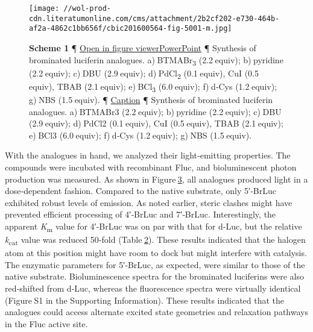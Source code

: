 \begin{figure}
\centering
\texttt{[image: //wol-prod-cdn.literatumonline.com/cms/attachment/2b2cf202-e730-464b-af2a-4862c1bb656f/cbic201600564-fig-5001-m.jpg]}
\caption{\textbf{Scheme 1} ¶ \protect\hyperlink{}{Open in figure
viewer}\href{/action/downloadFigures?id=cbic201600564-fig-5001\&doi=10.1002\%2Fcbic.201600564}{PowerPoint}
¶ Synthesis of brominated luciferin analogues.
a) BTMABr\textsubscript{3} (2.2 equiv); b) pyridine (2.2 equiv); c) DBU
(2.9 equiv); d) PdCl\textsubscript{2} (0.1 equiv), CuI (0.5 equiv), TBAB
(2.1 equiv); e) BCl\textsubscript{3} (6.0 equiv); f) {d}‐Cys
(1.2 equiv); g) NBS (1.5 equiv). ¶
\protect\hyperlink{}{{Caption}\emph{}} ¶ Synthesis of brominated
luciferin analogues. a) BTMABr3 (2.2 equiv); b) pyridine (2.2 equiv);
c) DBU (2.9 equiv); d) PdCl2 (0.1 equiv), CuI (0.5 equiv), TBAB
(2.1 equiv); e) BCl3 (6.0 equiv); f) d‐Cys (1.2 equiv); g) NBS
(1.5 equiv).}
\end{figure}

With the analogues in hand, we analyzed their light‐emitting properties.
The compounds were incubated with recombinant Fluc, and bioluminescent
photon production was measured. As shown in
Figure \protect\hyperlink{cbic201600564-fig-0002}{3}, all analogues
produced light in a dose‐dependent fashion. Compared to the native
substrate, only 5′‐BrLuc exhibited robust levels of emission. As noted
earlier, steric clashes might have prevented efficient processing of
4′‐BrLuc and 7′‐BrLuc. Interestingly, the apparent
\emph{K}\textsubscript{m} value for 4′‐BrLuc was on par with that for
{d}‐Luc, but the relative \emph{k}\textsubscript{cat} value was reduced
50‐fold (Table \protect\hyperlink{cbic201600564-tbl-0002}{2}). These
results indicated that the halogen atom at this position might have room
to dock but might interfere with catalysis. The enzymatic parameters for
5′‐BrLuc, as expected, were similar to those of the native substrate.
Bioluminescence spectra for the brominated luciferins were also
red‐shifted from {d}‐Luc, whereas the fluorescence spectra were
virtually identical (Figure S1 in the Supporting Information). These
results indicated that the analogues could access alternate excited
state geometries and relaxation pathways in the Fluc active site.

